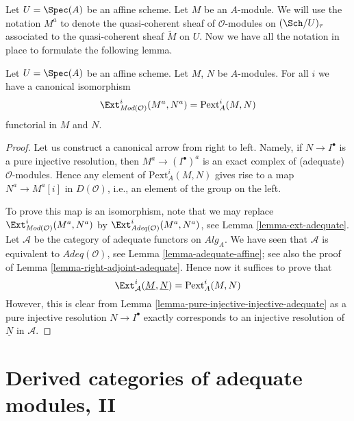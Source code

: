 \noindent
Let $U = \Spec(A)$ be an affine scheme. Let $M$ be an $A$-module.
We will use the notation $M^a$ to denote the quasi-coherent sheaf
of $\mathcal{O}$-modules on $(\Sch/U)_\tau$ associated to
the quasi-coherent sheaf $\widetilde{M}$ on $U$.
Now we have all the notation in place to formulate the following lemma.

\begin{lemma}
\label{lemma-big-ext}
Let $U = \Spec(A)$ be an affine scheme. Let $M$, $N$ be $A$-modules.
For all $i$ we have a canonical isomorphism
$$
\Ext^i_{\textit{Mod}(\mathcal{O})}(M^a, N^a) = \text{Pext}^i_A(M, N)
$$
functorial in $M$ and $N$.
\end{lemma}

\begin{proof}
Let us construct a canonical arrow from right to left. Namely, if
$N \to I^\bullet$ is a pure injective resolution, then
$M^a \to (I^\bullet)^a$ is an exact complex of (adequate)
$\mathcal{O}$-modules. Hence any element of $\text{Pext}^i_A(M, N)$
gives rise to a map $N^a \to M^a[i]$ in $D(\mathcal{O})$, i.e.,
an element of the group on the left.

\medskip\noindent
To prove this map is an isomorphism, note that we may replace
$\Ext^i_{\textit{Mod}(\mathcal{O})}(M^a, N^a)$ by
$\Ext^i_{\textit{Adeq}(\mathcal{O})}(M^a, N^a)$, see
Lemma \ref{lemma-ext-adequate}.
Let $\mathcal{A}$ be the category of adequate functors
on $\textit{Alg}_A$. We have seen that $\mathcal{A}$ is
equivalent to $\textit{Adeq}(\mathcal{O})$, see
Lemma \ref{lemma-adequate-affine}; see also the proof of
Lemma \ref{lemma-right-adjoint-adequate}.
Hence now it suffices to prove that
$$
\Ext^i_\mathcal{A}(\underline{M}, \underline{N}) =
\text{Pext}^i_A(M, N)
$$
However, this is clear from
Lemma \ref{lemma-pure-injective-injective-adequate}
as a pure injective resolution $N \to I^\bullet$ exactly corresponds
to an injective resolution of $\underline{N}$ in $\mathcal{A}$.
\end{proof}







\section{Derived categories of adequate modules, II}
\label{section-derived-categories}

